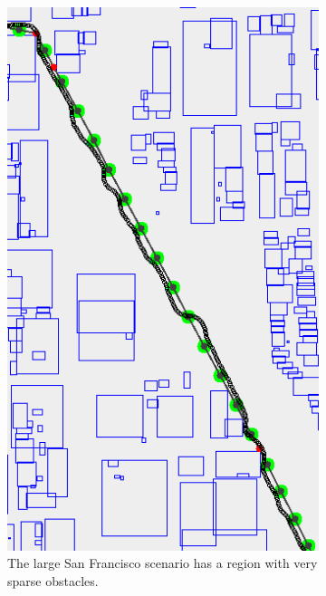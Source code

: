 \begin{figure}
	\centering
	
	\begin{subfigure}[t]{.40\textwidth}
        		\includegraphics[width=\textwidth]{img/sf-sparse}
        		\caption{The large San Francisco scenario has a region with very sparse obstacles.}
        		\label{fig:sf-sparse}
	\end{subfigure}
	\hfil
	\begin{subfigure}[t]{.45\textwidth}

\end{subfigure}
\end{figure}
